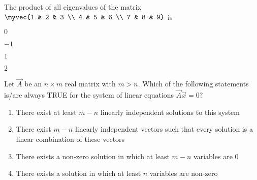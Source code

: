     \item The product of all eigenvalues of the matrix $\myvec{1 & 2 & 3 \\ 4 & 5 & 6 \\ 7 & 8 & 9}$ is
    \hfill{}
    \begin{enumerate}
        \begin{multicols}{4}
            \item $0$
            \item $-1$
            \item $1$
            \item $2$
        \end{multicols}
    \end{enumerate}
    \item Let $\vec{A}$ be an $n \times m$ real matrix with $m > n$. Which of the following statements is/are always TRUE for the system of linear equations $\vec{A}\vec{x}=0$?
    \hfill{}
    \begin{enumerate}
        \item There exist at least $m-n$ linearly independent solutions to this system
        \item There exist $m-n$ linearly independent vectors such that every solution is a linear combination of these vectors
        \item There exists a non-zero solution in which at least $m-n$ variables are 0
        \item There exists a solution in which at least $n$ variables are non-zero
    \end{enumerate}
